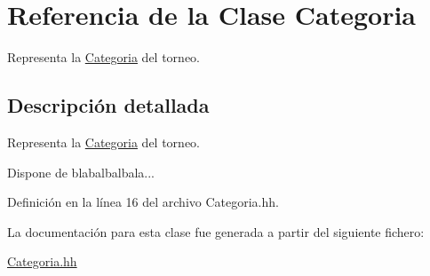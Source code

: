 \hypertarget{class_categoria}{}\section{Referencia de la Clase Categoria}
\label{class_categoria}


Representa la \mbox{\hyperlink{class_categoria}{Categoria}} del torneo.  




\subsection{Descripción detallada}
Representa la \mbox{\hyperlink{class_categoria}{Categoria}} del torneo. 

Dispone de blabalbalbala... 

Definición en la línea 16 del archivo Categoria.\+hh.



La documentación para esta clase fue generada a partir del siguiente fichero\+:\begin{DoxyCompactItemize}
\item 
\mbox{\hyperlink{_categoria_8hh}{Categoria.\+hh}}\end{DoxyCompactItemize}
